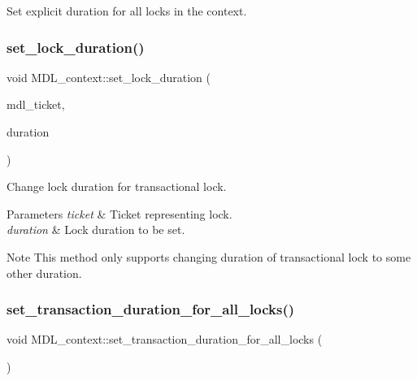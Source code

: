 Set explicit duration for all locks in the context. \mbox{\label{classMDL__context_a5836b7c79f957c575c90ad4f1d8296de}} 
\subsubsection{\texorpdfstring{set\+\_\+lock\+\_\+duration()}{set\_lock\_duration()}}
{\footnotesize\ttfamily void M\+D\+L\+\_\+context\+::set\+\_\+lock\+\_\+duration (\begin{DoxyParamCaption}\item[{\mbox{\hyperlink{classMDL__ticket}{M\+D\+L\+\_\+ticket}} $\ast$}]{mdl\+\_\+ticket,  }\item[{enum\+\_\+mdl\+\_\+duration}]{duration }\end{DoxyParamCaption})}

Change lock duration for transactional lock.


\begin{DoxyParams}{Parameters}
{\em ticket} & Ticket representing lock. \\
\hline
{\em duration} & Lock duration to be set.\\
\hline
\end{DoxyParams}
\begin{DoxyNote}{Note}
This method only supports changing duration of transactional lock to some other duration. 
\end{DoxyNote}
\mbox{\label{classMDL__context_ad1b07243d69f1354e3bb5936dd6ded15}} 
\subsubsection{\texorpdfstring{set\+\_\+transaction\+\_\+duration\+\_\+for\+\_\+all\+\_\+locks()}{set\_transaction\_duration\_for\_all\_locks()}}
{\footnotesize\ttfamily void M\+D\+L\+\_\+context\+::set\+\_\+transaction\+\_\+duration\+\_\+for\+\_\+all\+\_\+locks (\begin{DoxyParamCaption}{ }\end{DoxyParamCaption})}

